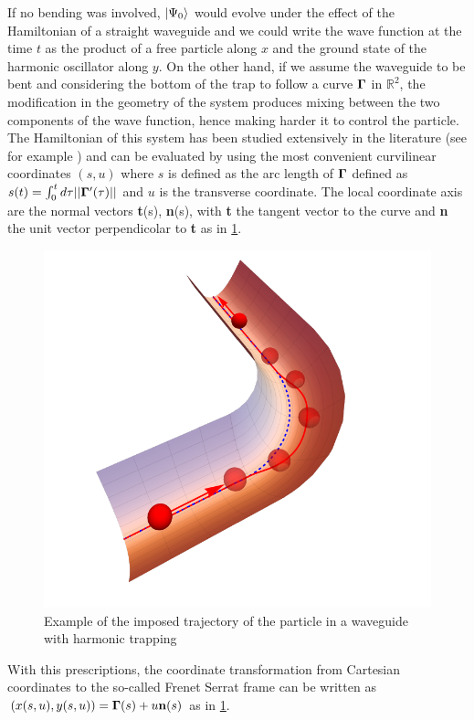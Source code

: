 If no bending was involved, $\ket{\Psi_0}$  would evolve under the effect of the Hamiltonian of a straight waveguide and we could write the wave function at the time $t$ as the product of a free particle along $x$ and the ground state of the harmonic oscillator along $y$. 
On the other hand, if we assume the waveguide to be bent and considering the bottom of the trap to follow a curve $\mathbf{\Gamma}$ in $\mathbb{R}^2$, the modification in the geometry of the system produces mixing between the two components of the wave function, hence making harder it to control the particle.
The Hamiltonian of this system has been studied extensively in the literature (see for example \cite{TheEffectiveHKrejci2012}) and can be evaluated by using the most convenient curvilinear coordinates $(s,u)$ where $s$ is defined as the arc length of $\mathbf{\Gamma}$ defined as $s(t) = \int_0^t d\tau||\mathbf{\Gamma}'(\tau)||$ and $u$ is the transverse coordinate.
The local coordinate axis are the normal vectors \textbf{t}(s), \textbf{n}(s), with \textbf{t} the tangent vector to the curve and \textbf{n} the unit vector perpendicolar to \textbf{t} as in  \cref{fig:setup}.
\begin{figure}
		\includegraphics[width = .7\columnwidth]{gfx/tube.pdf}
		\caption{%
		 Example of the imposed trajectory of the particle in a waveguide with harmonic trapping}
		\label{fig:setup}
\end{figure}
With this prescriptions, the coordinate transformation from Cartesian coordinates to the so-called Frenet Serrat frame can be written as $(x(s,u), y(s,u)) = \mathbf{\Gamma}(s)  + u \mathbf{n}(s) $ as in \cref{fig:setup}.
